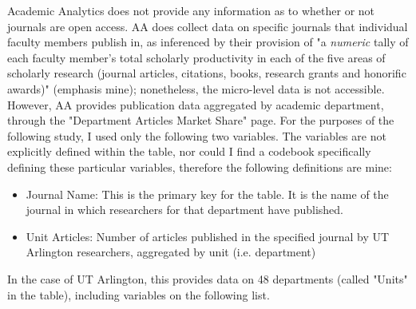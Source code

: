 \documentclass{article}
\begin{document}
Academic Analytics does not provide any information as to whether or not journals are open access. 
AA does collect data on specific journals that individual faculty members publish in, as inferenced by their provision of "a \textit{numeric} tally of each faculty member’s total scholarly productivity in each of the five areas of scholarly research (journal articles, citations, books, research grants and honorific awards)" (emphasis mine); nonetheless, the micro-level data is not accessible. 
However, AA provides publication data aggregated by academic department, through the "Department Articles Market Share" page. 
For the purposes of the following study, I used only the following two variables.                             
The variables are not explicitly defined within the table, nor could I find a codebook specifically defining these particular variables, therefore the following definitions are mine:
\begin{itemize}
	\item Journal Name: This is the primary key for the table. It is the name of the journal in which researchers for that department have published.
	\item Unit Articles: Number of articles published in the specified journal by UT Arlington researchers, aggregated by unit (i.e. department)
\end{itemize}

 In the case of UT Arlington, this provides data on 48 departments (called "Units" in the table), including variables on the following list. 
\end{document}
